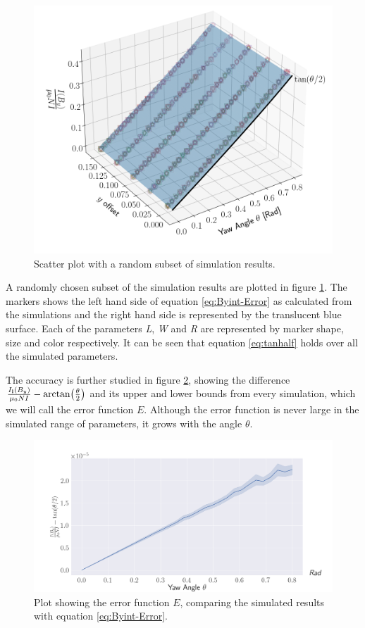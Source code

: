 \begin{figure}[h!]
    \centering
    \includegraphics[width=0.8\linewidth]{figs/ByInt3D}
    \caption{Scatter plot with a random subset of simulation results.}
    \label{fig:ByInt3D}
\end{figure}



A randomly chosen subset of the simulation results are plotted in figure \ref{fig:ByInt3D}.
The markers shows the left hand side of equation \ref{eq:Byint-Error}
as calculated from the simulations and the right hand side is represented by the translucent
blue surface.
Each of the parameters \emph{L}, \emph{W} and \emph{R} are represented
by marker shape, size and color respectively. It can be seen that
equation \ref{eq:tanhalf} holds over all the simulated parameters.

The accuracy is further studied in figure \ref{fig:ByInt-Error},
showing the difference \newline
$\frac{I_{\vb{l}}(B_y)}{\mu_0NI} - \arctan(\frac{\theta}{2})$ and its upper
and lower bounds from every simulation, which
we will call the error function $E$. Although the error function
is never large in the simulated range of parameters,
it grows with the angle $\theta$.

\begin{figure}[h!]
    \centering
    \includegraphics[width=\linewidth]{figs/ByIntError}
    \caption{Plot showing the error function $E$, comparing the simulated results
        with equation \ref{eq:Byint-Error}.}
    \label{fig:ByInt-Error}
\end{figure}


